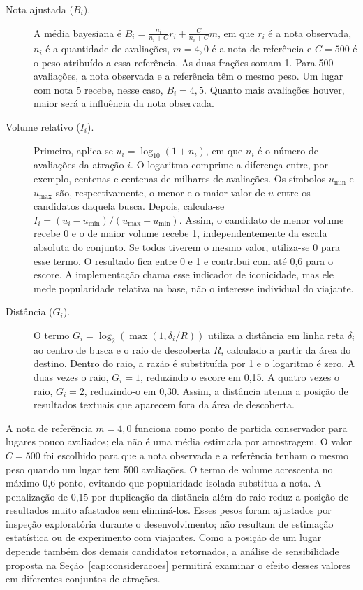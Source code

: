 \begin{description}
  \item[Nota ajustada ($B_i$).] A média bayesiana é $B_i = \frac{n_i}{n_i+C}r_i + \frac{C}{n_i+C}m$, em que $r_i$ é a nota observada, $n_i$ é a quantidade de avaliações, $m=4{,}0$ é a nota de referência e $C=500$ é o peso atribuído a essa referência. As duas frações somam 1. Para 500 avaliações, a nota observada e a referência têm o mesmo peso. Um lugar com nota 5 recebe, nesse caso, $B_i=4{,}5$. Quanto mais avaliações houver, maior será a influência da nota observada.
  \item[Volume relativo ($I_i$).] Primeiro, aplica-se $u_i=\log_{10}(1+n_i)$, em que $n_i$ é o número de avaliações da atração $i$. O logaritmo comprime a diferença entre, por exemplo, centenas e centenas de milhares de avaliações. Os símbolos $u_{\min}$ e $u_{\max}$ são, respectivamente, o menor e o maior valor de $u$ entre os candidatos daquela busca. Depois, calcula-se $I_i=(u_i-u_{\min})/(u_{\max}-u_{\min})$. Assim, o candidato de menor volume recebe 0 e o de maior volume recebe 1, independentemente da escala absoluta do conjunto. Se todos tiverem o mesmo valor, utiliza-se 0 para esse termo. O resultado fica entre 0 e 1 e contribui com até 0,6 para o escore. A implementação chama esse indicador de iconicidade, mas ele mede popularidade relativa na base, não o interesse individual do viajante.
  \item[Distância ($G_i$).] O termo $G_i=\log_2(\max(1,\delta_i/R))$ utiliza a distância em linha reta $\delta_i$ ao centro de busca e o raio de descoberta $R$, calculado a partir da área do destino. Dentro do raio, a razão é substituída por 1 e o logaritmo é zero. A duas vezes o raio, $G_i=1$, reduzindo o escore em 0,15. A quatro vezes o raio, $G_i=2$, reduzindo-o em 0,30. Assim, a distância atenua a posição de resultados textuais que aparecem fora da área de descoberta.
\end{description}

A nota de referência $m=4{,}0$ funciona como ponto de partida conservador para lugares pouco avaliados; ela não é uma média estimada por amostragem. O valor $C=500$ foi escolhido para que a nota observada e a referência tenham o mesmo peso quando um lugar tem 500 avaliações. O termo de volume acrescenta no máximo 0,6 ponto, evitando que popularidade isolada substitua a nota. A penalização de 0,15 por duplicação da distância além do raio reduz a posição de resultados muito afastados sem eliminá-los. Esses pesos foram ajustados por inspeção exploratória durante o desenvolvimento; não resultam de estimação estatística ou de experimento com viajantes. Como a posição de um lugar depende também dos demais candidatos retornados, a análise de sensibilidade proposta na Seção~\ref{cap:consideracoes} permitirá examinar o efeito desses valores em diferentes conjuntos de atrações.

